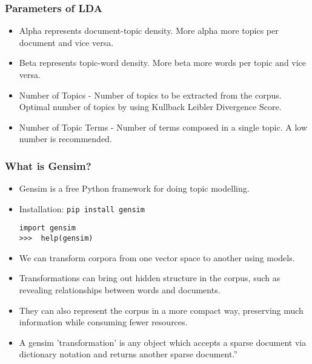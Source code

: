 \begin{frame}[fragile]\frametitle{Parameters of LDA}
  \begin{itemize}
\item Alpha represents document-topic density. More alpha more topics per document and vice versa.
\item Beta represents topic-word density. More beta more words per topic and vice versa.
\item Number of Topics - Number of topics to be extracted from the corpus. Optimal number of topics by using Kullback Leibler Divergence Score.
\item Number of Topic Terms - Number of terms composed in a single topic. A low number is recommended.
  \end{itemize}
\end{frame}
\begin{frame}[fragile]\frametitle{What is Gensim?}
  \begin{itemize}
  	\item Gensim is a free Python framework for doing topic modelling.
	\item Installation: \lstinline|pip install gensim|

	\begin{lstlisting}
import gensim
>>>  help(gensim)
\end{lstlisting}
  	\item We can transform corpora from one vector space to another using models. 
	\item Transformations can bring out hidden structure in the corpus, such as revealing relationships between words and documents. 
	\item They can also represent the corpus in a more compact way, preserving much information while consuming fewer resources.
	\item A gensim 'transformation' is any object which accepts a sparse document via dictionary notation and returns another sparse document.''
		  \end{itemize}
\end{frame}

